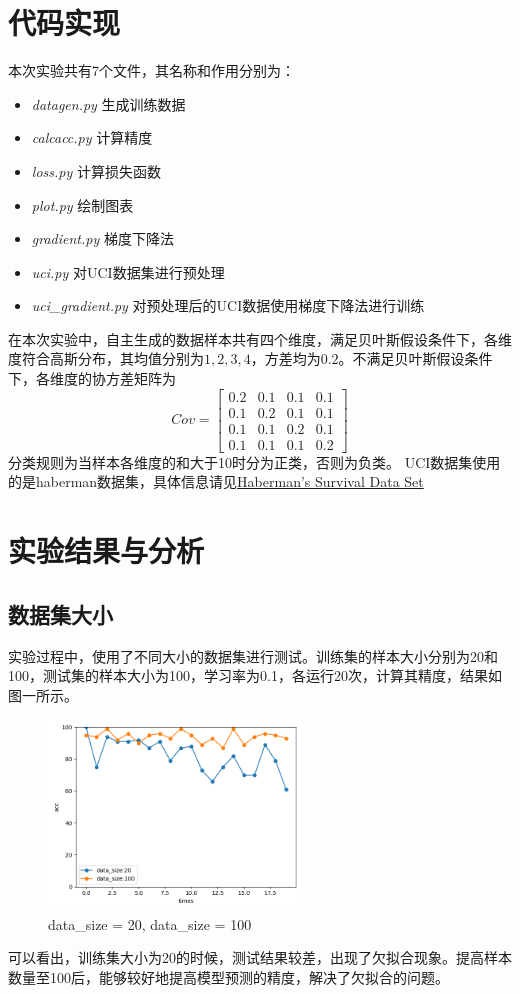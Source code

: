 \documentclass[a4paper,11pt,UTF8]{ctexart}
\newcommand{\bottomcaption}{%
\setlength{\abovecaptionskip}{6pt}%
\setlength{\belowcaptionskip}{6pt}%
\caption}
\begin{document}
\section{代码实现}
本次实验共有7个文件，其名称和作用分别为：
\begin{itemize}
  \item \emph{datagen.py} \quad 生成训练数据
  \item \emph{calcacc.py} \quad 计算精度
  \item \emph{loss.py} \quad 计算损失函数
  \item \emph{plot.py} \quad 绘制图表
  \item \emph{gradient.py} \quad 梯度下降法
  \item \emph{uci.py} \quad 对UCI数据集进行预处理
  \item \emph{uci\_gradient.py} \quad 对预处理后的UCI数据使用梯度下降法进行训练
\end{itemize}
在本次实验中，自主生成的数据样本共有四个维度，满足贝叶斯假设条件下，各维度符合高斯分布，其均值分别为$1,2,3,4$，方差均为$0.2$。不满足贝叶斯假设条件下，各维度的协方差矩阵为
$$Cov = \begin{bmatrix}
0.2 & 0.1 & 0.1 & 0.1 \\
0.1 & 0.2 & 0.1 & 0.1 \\
0.1 & 0.1 & 0.2 & 0.1 \\
0.1 & 0.1 & 0.1 & 0.2
\end{bmatrix}$$
分类规则为当样本各维度的和大于10时分为正类，否则为负类。
UCI数据集使用的是haberman数据集，具体信息请见\href{https://archive.ics.uci.edu/ml/datasets/Haberman%27s+Survival}{Haberman's Survival Data Set}
\section{实验结果与分析}
\subsection{数据集大小}
实验过程中，使用了不同大小的数据集进行测试。训练集的样本大小分别为20和100，测试集的样本大小为100，学习率为0.1，各运行20次，计算其精度，结果如图一所示。
\begin{figure}[htbp]
  \centering
  \includegraphics[width=0.6\textwidth]{img_1.png}
  \bottomcaption{data\_size = 20, data\_size = 100}
\end{figure}
可以看出，训练集大小为20的时候，测试结果较差，出现了欠拟合现象。提高样本数量至100后，能够较好地提高模型预测的精度，解决了欠拟合的问题。
\end{document}
